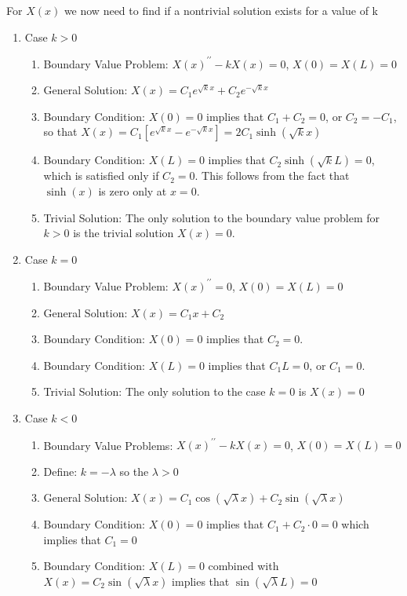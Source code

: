 For $X(x)$ we now need to find if a nontrivial solution exists for a value of k
\begin{enumerate}
  \item Case $k>0$
  \begin{enumerate}
  	\item Boundary Value Problem: $X(x)^{\prime\prime}-kX(x)=0$, $X(0)=X(L)=0$
  	\item General Solution: $X(x) = C_1 e^{\sqrt{k}x} + C_2 e^{-\sqrt{k}x}$
    \item Boundary Condition: $X(0) = 0$ implies that $C_1 + C_2 = 0$, or $C_2 = -C_1$, so that $X(x)=C_1 [e^{\sqrt{k}x} - e^{-\sqrt{k}x}  ] = 2C_1 \sinh ( \sqrt{k}x )$
    \item Boundary Condition: $X(L) = 0$ implies that $C_2\sinh (\sqrt{k}L) = 0$, which is satisfied only if $C_2 =0$. This follows from the fact that $\sinh(x)$ is zero only at $x = 0$.  
    \item Trivial Solution: The only solution to the boundary value problem for $k>0$ is the trivial solution $X(x)=0$.
  \end{enumerate}
  \item Case $k = 0$
  \begin{enumerate}
  	\item Boundary Value Problem: $X(x)^{\prime\prime}=0$, $X(0)=X(L)=0$
  	\item General Solution: $X(x)=C_1x+C_2$
    \item Boundary Condition: $X(0)=0$ implies that $C_2 = 0$. 
    \item Boundary Condition: $X(L)=0$ implies that $C_1L = 0$, or $C_1 = 0$.  
    \item Trivial Solution: The only solution to the case $k=0$ is $X(x) = 0$ 
  \end{enumerate}
  \item Case $k<0$
  \begin{enumerate}
  	\item Boundary Value Problems: $X(x)^{\prime\prime}-kX(x)=0$, $X(0)=X(L)=0$
  	\item Define: $k = -\lambda$ so the $\lambda > 0$
  	\item General Solution: $X(x) = C_1\cos(\sqrt{\lambda}x) + C_2\sin(\sqrt{\lambda}x)$
    \item Boundary Condition: $X(0) = 0$ implies that $C_1 + C_2 \cdot 0 = 0$ which implies that $C_1 = 0$
    \item Boundary Condition: $X(L) = 0$ combined with $X(x)=C_2\sin(\sqrt{\lambda}x)$ implies that $\sin(\sqrt{\lambda}L) = 0$
  \end{enumerate}
\end{enumerate}

